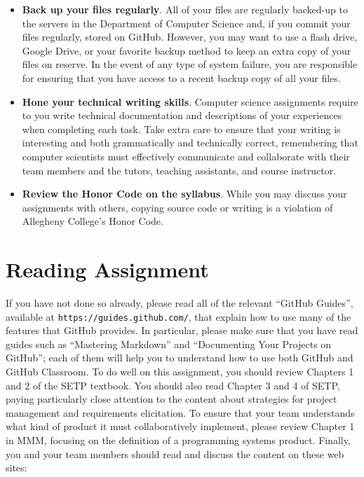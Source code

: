 \documentclass[11pt]{article}
\newcommand{\url}[1]{\lstinline{#1}}
\begin{document}
\begin{itemize}
\item {\bf Back up your files regularly}. All of your files are regularly backed-up to the servers in the Department of
  Computer Science and, if you commit your files regularly, stored on GitHub. However, you may want to use a flash
  drive, Google Drive, or your favorite backup method to keep an extra copy of your files on reserve. In the event of
  any type of system failure, you are responsible for ensuring that you have access to a recent backup copy of all your
  files.

\item {\bf Hone your technical writing skills}. Computer science assignments require to you write technical
  documentation and descriptions of your experiences when completing each task. Take extra care to ensure that your
  writing is interesting and both grammatically and technically correct, remembering that computer scientists must
  effectively communicate and collaborate with their team members and the tutors, teaching assistants, and course
  instructor.

\item {\bf Review the Honor Code on the syllabus}. While you may discuss your assignments with others, copying source
  code or writing is a violation of Allegheny College's Honor Code.

\end{itemize}

\vspace*{-1em}

\section*{Reading Assignment}

If you have not done so already, please read all of the relevant ``GitHub Guides'', available at
\url{https://guides.github.com/}, that explain how to use many of the features that GitHub provides. In particular,
please make sure that you have read guides such as ``Mastering Markdown'' and ``Documenting Your Projects on GitHub'';
each of them will help you to understand how to use both GitHub and GitHub Classroom. To do well on this assignment, you
should review Chapters 1 and 2 of the SETP textbook. You should also read Chapter 3 and 4 of SETP, paying particularly
close attention to the content about strategies for project management and requirements elicitation. To ensure that your
team understands what kind of product it must collaboratively implement, please review Chapter 1 in MMM, focusing on the
definition of a programming systems product. Finally, you and your team members should read and discuss the content on
these web sites:
\end{document}
